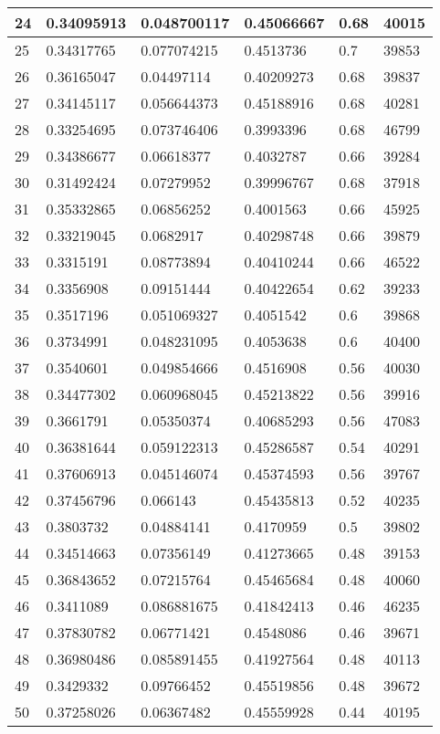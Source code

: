 \begin{longtable}{|l|l|l|l|l|l|}
24 & 0.34095913 & 0.048700117 & 0.45066667 & 0.68 & 40015 \\ \hline 
25 & 0.34317765 & 0.077074215 & 0.4513736 & 0.7 & 39853 \\ \hline 
26 & 0.36165047 & 0.04497114 & 0.40209273 & 0.68 & 39837 \\ \hline 
27 & 0.34145117 & 0.056644373 & 0.45188916 & 0.68 & 40281 \\ \hline 
28 & 0.33254695 & 0.073746406 & 0.3993396 & 0.68 & 46799 \\ \hline 
29 & 0.34386677 & 0.06618377 & 0.4032787 & 0.66 & 39284 \\ \hline 
30 & 0.31492424 & 0.07279952 & 0.39996767 & 0.68 & 37918 \\ \hline 
31 & 0.35332865 & 0.06856252 & 0.4001563 & 0.66 & 45925 \\ \hline 
32 & 0.33219045 & 0.0682917 & 0.40298748 & 0.66 & 39879 \\ \hline 
33 & 0.3315191 & 0.08773894 & 0.40410244 & 0.66 & 46522 \\ \hline 
34 & 0.3356908 & 0.09151444 & 0.40422654 & 0.62 & 39233 \\ \hline 
35 & 0.3517196 & 0.051069327 & 0.4051542 & 0.6 & 39868 \\ \hline 
36 & 0.3734991 & 0.048231095 & 0.4053638 & 0.6 & 40400 \\ \hline 
37 & 0.3540601 & 0.049854666 & 0.4516908 & 0.56 & 40030 \\ \hline 
38 & 0.34477302 & 0.060968045 & 0.45213822 & 0.56 & 39916 \\ \hline 
39 & 0.3661791 & 0.05350374 & 0.40685293 & 0.56 & 47083 \\ \hline 
40 & 0.36381644 & 0.059122313 & 0.45286587 & 0.54 & 40291 \\ \hline 
41 & 0.37606913 & 0.045146074 & 0.45374593 & 0.56 & 39767 \\ \hline 
42 & 0.37456796 & 0.066143 & 0.45435813 & 0.52 & 40235 \\ \hline 
43 & 0.3803732 & 0.04884141 & 0.4170959 & 0.5 & 39802 \\ \hline 
44 & 0.34514663 & 0.07356149 & 0.41273665 & 0.48 & 39153 \\ \hline 
45 & 0.36843652 & 0.07215764 & 0.45465684 & 0.48 & 40060 \\ \hline 
46 & 0.3411089 & 0.086881675 & 0.41842413 & 0.46 & 46235 \\ \hline 
47 & 0.37830782 & 0.06771421 & 0.4548086 & 0.46 & 39671 \\ \hline 
48 & 0.36980486 & 0.085891455 & 0.41927564 & 0.48 & 40113 \\ \hline 
49 & 0.3429332 & 0.09766452 & 0.45519856 & 0.48 & 39672 \\ \hline 
50 & 0.37258026 & 0.06367482 & 0.45559928 & 0.44 & 40195 \\ \hline 
\end{longtable}